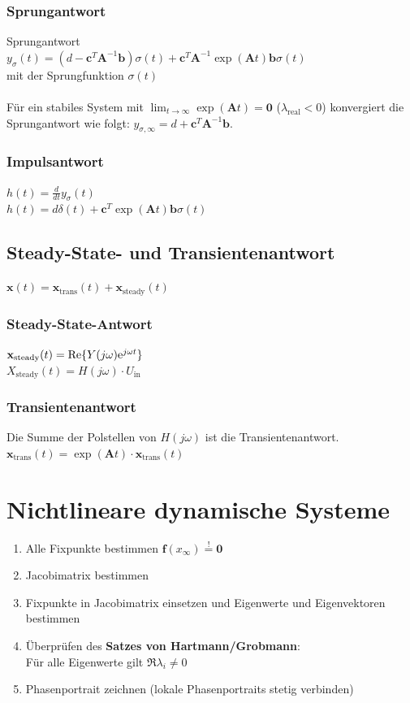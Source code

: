 \documentclass[fs, footer]{latex4ei}
\begin{document}
\begin{multicols*}{4}
\subsubsection{Sprungantwort}

Sprungantwort \\$y_\sigma(t) = (d-\mathbf{c}^T\mathbf{A}^{-1}\mathbf{b})\sigma (t) + \mathbf{c}^T\mathbf{A}^{-1}\exp{(\mathbf{A}t)}\mathbf{b}\sigma(t)$ \\
mit der Sprungfunktion $\sigma(t)$\\ \\
Für ein stabiles System mit $\lim_{t\rightarrow\infty}\exp{(\mathbf{A}t)} = \mathbf{0}$ ($\lambda_{\text{real}} < 0$) konvergiert die Sprungantwort wie folgt: $y_{\sigma,\infty} = d + \mathbf{c}^T\mathbf{A}^{-1}\mathbf{b}$.
\subsubsection{Impulsantwort}
$h(t) = \frac{d}{dt} y_\sigma(t)$\\
$h(t) = d\delta (t) + \mathbf{c}^T\exp{(\mathbf{A}t)}\mathbf{b}\sigma(t)$
\subsection{Steady-State- und Transientenantwort}
$\mathbf{x}(t) = \mathbf{x}_{\text{trans}}(t) + \mathbf{x}_{\text{steady}}(t)$
\subsubsection{Steady-State-Antwort}
$\mathbf{x}_{\text{steady}}(t) = \text{Re}\{Y(j\omega)\mathrm{e}^{j\omega t}\}$\\
$X_{\text{steady}}(t) = H(j\omega) \cdot U_{\text{in}}$
\subsubsection{Transientenantwort}
Die Summe der Polstellen von $H(j\omega)$ ist die Transientenantwort.\\
$\mathbf{x}_{\text{trans}}(t) = \exp{(\mathbf{A}t)} \cdot \mathbf{x}_{\text{trans}}(t)$
\section{Nichtlineare dynamische Systeme}
\begin{enumerate}
    \item Alle Fixpunkte bestimmen $\mathbf{f}(x_\infty) \stackrel{!}{=} \mathbf{0}$
    \item Jacobimatrix bestimmen
    \item Fixpunkte in Jacobimatrix einsetzen und Eigenwerte und Eigenvektoren bestimmen
    \item Überprüfen des \textbf{Satzes von Hartmann/Grobmann}: \\Für alle Eigenwerte gilt $\Re{\lambda_i} \neq 0$
    \item Phasenportrait zeichnen (lokale Phasenportraits stetig verbinden)
\end{enumerate}

\end{multicols*}
\end{document}
